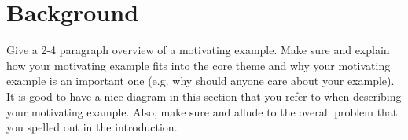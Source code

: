 \section{Background}
\label{background}

Give a 2-4 paragraph overview of a motivating
example. Make sure and explain how your motivating
example fits into the core theme and why your
motivating example is an important one (e.g. why
should anyone care about your example). It is
good to have a nice diagram in this section that
you refer to when describing your motivating
example. Also, make sure and allude to the
overall problem that you spelled out in the
introduction.
